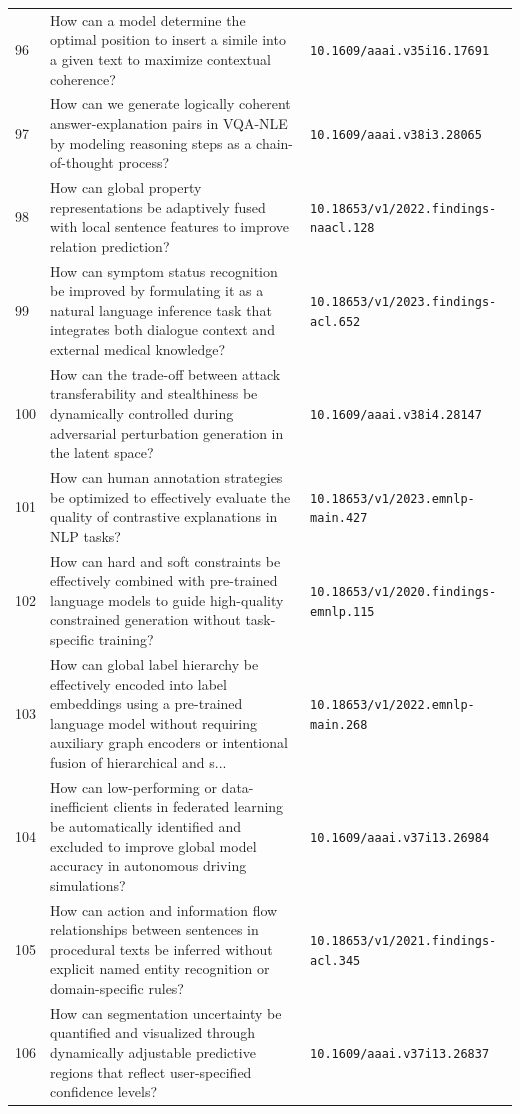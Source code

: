 \documentclass[runningheads]{llncs}
\begin{document}
\begin{longtable}{@{}p{0.5cm}p{7.2cm}p{2.5cm}@{}}
96 & How can a model determine the optimal position to insert a simile into a given text to maximize contextual coherence? & \texttt{10.1609/aaai.v35i16.17691} \\
97 & How can we generate logically coherent answer-explanation pairs in VQA-NLE by modeling reasoning steps as a chain-of-thought process? & \texttt{10.1609/aaai.v38i3.28065} \\
98 & How can global property representations be adaptively fused with local sentence features to improve relation prediction? & \texttt{10.18653/v1/2022.findings-naacl.128} \\
99 & How can symptom status recognition be improved by formulating it as a natural language inference task that integrates both dialogue context and external medical knowledge? & \texttt{10.18653/v1/2023.findings-acl.652} \\
100 & How can the trade-off between attack transferability and stealthiness be dynamically controlled during adversarial perturbation generation in the latent space? & \texttt{10.1609/aaai.v38i4.28147} \\
101 & How can human annotation strategies be optimized to effectively evaluate the quality of contrastive explanations in NLP tasks? & \texttt{10.18653/v1/2023.emnlp-main.427} \\
102 & How can hard and soft constraints be effectively combined with pre-trained language models to guide high-quality constrained generation without task-specific training? & \texttt{10.18653/v1/2020.findings-emnlp.115} \\
103 & How can global label hierarchy be effectively encoded into label embeddings using a pre-trained language model without requiring auxiliary graph encoders or intentional fusion of hierarchical and s... & \texttt{10.18653/v1/2022.emnlp-main.268} \\
104 & How can low-performing or data-inefficient clients in federated learning be automatically identified and excluded to improve global model accuracy in autonomous driving simulations? & \texttt{10.1609/aaai.v37i13.26984} \\
105 & How can action and information flow relationships between sentences in procedural texts be inferred without explicit named entity recognition or domain-specific rules? & \texttt{10.18653/v1/2021.findings-acl.345} \\
106 & How can segmentation uncertainty be quantified and visualized through dynamically adjustable predictive regions that reflect user-specified confidence levels? & \texttt{10.1609/aaai.v37i13.26837} \\

\end{longtable}
\end{document}
